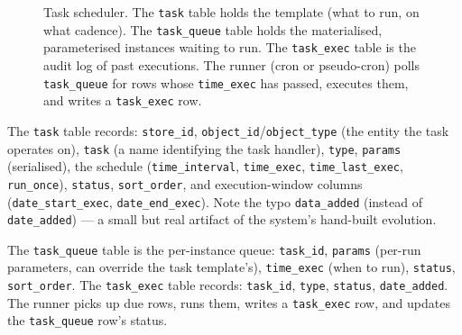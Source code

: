 \documentclass[11pt,a4paper]{article}
\begin{document}
\begin{figure}[htbp]
\centering
{}
\caption{Task scheduler. The \texttt{task} table holds the
template (what to run, on what cadence). The
\texttt{task\_queue} table holds the materialised,
parameterised instances waiting to run. The
\texttt{task\_exec} table is the audit log of past
executions. The runner (cron or pseudo-cron) polls
\texttt{task\_queue} for rows whose \texttt{time\_exec} has
passed, executes them, and writes a \texttt{task\_exec} row.}
\label{fig:tasks}
\end{figure}

The \texttt{task} table records: \texttt{store\_id},
\texttt{object\_id}/\texttt{object\_type} (the entity the task
operates on), \texttt{task} (a name identifying the task
handler), \texttt{type}, \texttt{params} (serialised), the
schedule (\texttt{time\_interval}, \texttt{time\_exec},
\texttt{time\_last\_exec}, \texttt{run\_once}),
\texttt{status}, \texttt{sort\_order}, and execution-window
columns (\texttt{date\_start\_exec}, \texttt{date\_end\_exec}).
Note the typo \texttt{data\_added} (instead of
\texttt{date\_added}) --- a small but real artifact of the
system's hand-built evolution.

The \texttt{task\_queue} table is the per-instance queue:
\texttt{task\_id}, \texttt{params} (per-run parameters, can
override the task template's), \texttt{time\_exec} (when to
run), \texttt{status}, \texttt{sort\_order}. The
\texttt{task\_exec} table records: \texttt{task\_id},
\texttt{type}, \texttt{status}, \texttt{date\_added}. The
runner picks up due rows, runs them, writes a \texttt{task\_exec}
row, and updates the \texttt{task\_queue} row's status.
\end{document}
